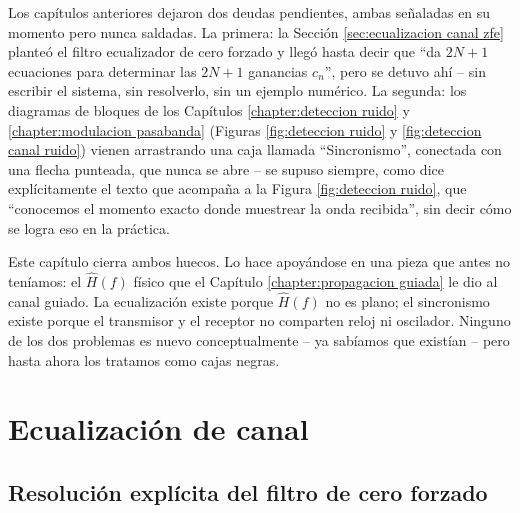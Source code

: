 Los capítulos anteriores dejaron dos deudas pendientes, ambas señaladas en su momento pero nunca saldadas. La primera: la Sección \ref{sec:ecualizacion canal zfe} planteó el filtro ecualizador de cero forzado y llegó hasta decir que ``da $2N+1$ ecuaciones para determinar las $2N+1$ ganancias $c_n$'', pero se detuvo ahí -- sin escribir el sistema, sin resolverlo, sin un ejemplo numérico. La segunda: los diagramas de bloques de los Capítulos \ref{chapter:deteccion ruido} y \ref{chapter:modulacion pasabanda} (Figuras \ref{fig:deteccion ruido} y \ref{fig:deteccion canal ruido}) vienen arrastrando una caja llamada ``Sincronismo'', conectada con una flecha punteada, que nunca se abre -- se supuso siempre, como dice explícitamente el texto que acompaña a la Figura \ref{fig:deteccion ruido}, que ``conocemos el momento exacto donde muestrear la onda recibida'', sin decir cómo se logra eso en la práctica.

Este capítulo cierra ambos huecos. Lo hace apoyándose en una pieza que antes no teníamos: el $\hat H(f)$ físico que el Capítulo \ref{chapter:propagacion guiada} le dio al canal guiado. La ecualización existe porque $\hat H(f)$ no es plano; el sincronismo existe porque el transmisor y el receptor no comparten reloj ni oscilador. Ninguno de los dos problemas es nuevo conceptualmente -- ya sabíamos que existían -- pero hasta ahora los tratamos como cajas negras.

\section{Ecualización de canal}\label{sec:ecualizacion}

\subsection*{Resolución explícita del filtro de cero forzado}

